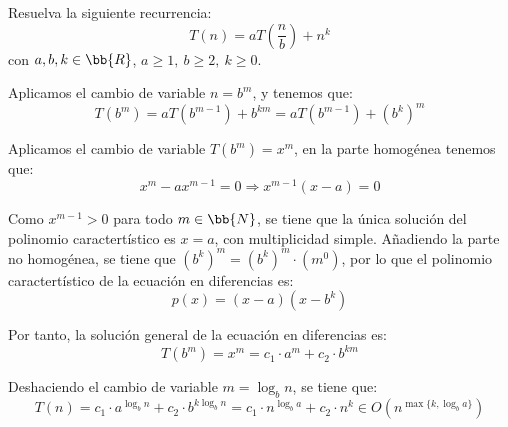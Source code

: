 \begin{ejercicio}
    Resuelva la siguiente recurrencia:
    \begin{equation*}
        T(n)=aT\left(\frac{n}{b}\right)+n^k
    \end{equation*}
    con $a,b,k\in \bb{R}$, $a\geq 1,~b\geq 2,~k\geq 0$.

    Aplicamos el cambio de variable $n=b^m$, y tenemos que:
    \begin{equation*}
        T(b^m)=aT\left(b^{m-1}\right)+b^{km}
        = aT\left(b^{m-1}\right)+(b^k)^m
    \end{equation*}

    Aplicamos el cambio de variable $T(b^m)=x^m$, en la parte homogénea tenemos que:
    \begin{equation*}
        x^m - ax^{m-1} = 0 \Longrightarrow x^{m-1}(x-a)=0
    \end{equation*}

    Como $x^{m-1}>0$ para todo $m\in \bb{N}$, se tiene que la única solución del polinomio caractertístico es $x=a$,
    con multiplicidad simple. Añadiendo la parte no homogénea, se tiene que $(b^k)^m =(b^k)^m \cdot (m^0)$, por lo que el polinomio caractertístico
    de la ecuación en diferencias es:
    \begin{equation*}
        p(x) = (x-a)(x-b^k)
    \end{equation*}

    Por tanto, la solución general de la ecuación en diferencias es:
    \begin{equation*}
        T(b^m) = x^m = c_1\cdot a^m + c_2\cdot b^{km}
    \end{equation*}

    Deshaciendo el cambio de variable $m=\log_b n$, se tiene que:
    \begin{equation*}
        T(n) = c_1\cdot a^{\log_b n} + c_2\cdot b^{k\log_b n} = c_1\cdot n^{\log_b a} + c_2\cdot n^k \in O\left(n^{\max\{k, \log_b a\}}\right)
    \end{equation*}

\end{ejercicio}